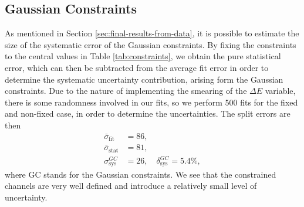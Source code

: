 \subsection{Gaussian Constraints}
As mentioned in Section \ref{sec:final-results-from-data}, it is possible to estimate the size of the systematic error of the Gaussian constraints. By fixing the constraints to the central values in Table \ref{tab:constraints}, we obtain the pure statistical error, which can then be subtracted from the average fit error in order to determine the systematic uncertainty contribution, arising form the Gaussian constraints. Due to the nature of implementing the smearing of the $\Delta E$ variable, there is some randomness involved in our fits, so we perform 500 fits for the fixed and non-fixed case, in order to determine the uncertainties. The split errors are then
\begin{align}
\bar \sigma_{\mathrm{fit}} &= 86, \\
\bar \sigma_{\mathrm{stat}} &= 81, \\
\sigma_{\mathrm{sys}}^{GC} &= 26,\quad \delta_{\mathrm{sys}}^{GC} = 5.4\%,
\end{align}
where GC stands for the Gaussian constraints. We see that the constrained channels are very well defined and introduce a relatively small level of uncertainty.


